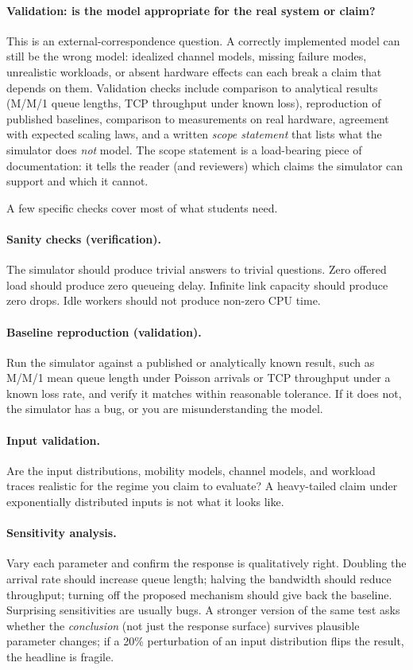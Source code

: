 \documentclass[11pt]{article}
\begin{document}
\paragraph{Validation: is the model appropriate for the real system or claim?} This is an external-correspondence question. A correctly implemented model can still be the wrong model: idealized channel models, missing failure modes, unrealistic workloads, or absent hardware effects can each break a claim that depends on them. Validation checks include comparison to analytical results (M/M/1 queue lengths, TCP throughput under known loss), reproduction of published baselines, comparison to measurements on real hardware, agreement with expected scaling laws, and a written \emph{scope statement} that lists what the simulator does \emph{not} model. The scope statement is a load-bearing piece of documentation: it tells the reader (and reviewers) which claims the simulator can support and which it cannot.

A few specific checks cover most of what students need.

\paragraph{Sanity checks (verification).} The simulator should produce trivial answers to trivial questions. Zero offered load should produce zero queueing delay. Infinite link capacity should produce zero drops. Idle workers should not produce non-zero CPU time.

\paragraph{Baseline reproduction (validation).} Run the simulator against a published or analytically known result, such as M/M/1 mean queue length under Poisson arrivals or TCP throughput under a known loss rate, and verify it matches within reasonable tolerance. If it does not, the simulator has a bug, or you are misunderstanding the model.

\paragraph{Input validation.} Are the input distributions, mobility models, channel models, and workload traces realistic for the regime you claim to evaluate? A heavy-tailed claim under exponentially distributed inputs is not what it looks like.

\paragraph{Sensitivity analysis.} Vary each parameter and confirm the response is qualitatively right. Doubling the arrival rate should increase queue length; halving the bandwidth should reduce throughput; turning off the proposed mechanism should give back the baseline. Surprising sensitivities are usually bugs. A stronger version of the same test asks whether the \emph{conclusion} (not just the response surface) survives plausible parameter changes; if a 20\% perturbation of an input distribution flips the result, the headline is fragile.
\end{document}
